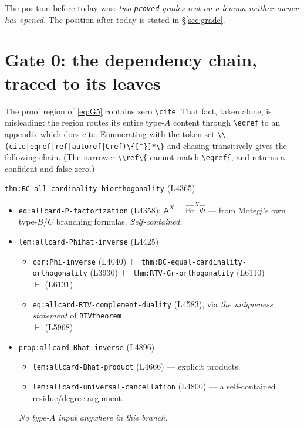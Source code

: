 \documentclass[11pt]{article}
\theoremstyle{plain}
\theoremstyle{definition}
\theoremstyle{remark}
\newcommand{\Bh}{\widehat{\mathrm{Br}}}
\begin{document}
The position before today was: \emph{two \texttt{proved} grades rest on a lemma
neither owner has opened.} The position after today is stated in
\S\ref{sec:grade}.

\section{Gate 0: the dependency chain, traced to its leaves}
\label{sec:gate}

The proof region of \eqref{eq:G5} contains zero \verb|\cite|. That fact, taken
alone, is misleading: the region routes its entire type-$A$ content through
\verb|\eqref| to an appendix which does cite. Enumerating with the token set
\verb+\\(cite|eqref|ref|autoref|Cref)\{[^}]*\}+ and chasing transitively gives the
following chain. (The narrower \verb+\\ref\{+ cannot match \verb+\eqref{+, and
returns a confident and false zero.)

\begin{center}
\begin{minipage}{0.95\textwidth}
\small
\texttt{thm:BC-all-cardinality-biorthogonality} (L4365)
\begin{itemize}[leftmargin=1.3em,itemsep=1pt]
\item[$\vdash$] \texttt{eq:allcard-P-factorization} (L4358):
      $\mathsf A^X=\Bh^X\widehat\Phi$ --- from Motegi's own type-$B$/$C$ branching
      formulas. \emph{Self-contained.}
\item[$\vdash$] \texttt{lem:allcard-Phihat-inverse} (L4425)
   \begin{itemize}[leftmargin=1.3em,itemsep=0pt]
   \item[$\vdash$] \texttt{cor:Phi-inverse} (L4040) $\vdash$
         \texttt{thm:BC-equal-cardinality-orthogonality} (L3930) $\vdash$
         \texttt{thm:RTV-Gr-orthogonality} (L6110)\\
         $\vdash$  (L6131)
   \item[$\vdash$] \texttt{eq:allcard-RTV-complement-duality} (L4583), via
         \emph{the uniqueness statement} of \texttt{RTVtheorem}\\
         $\vdash$  (L5968)
   \end{itemize}
\item[$\vdash$] \texttt{prop:allcard-Bhat-inverse} (L4896)
   \begin{itemize}[leftmargin=1.3em,itemsep=0pt]
   \item[$\vdash$] \texttt{lem:allcard-Bhat-product} (L4666) --- explicit products.
   \item[$\vdash$] \texttt{lem:allcard-universal-cancellation} (L4800) --- a
         self-contained residue/degree argument.
   \end{itemize}
   \emph{No type-$A$ input anywhere in this branch.}
\end{itemize}
\end{minipage}
\end{center}
\end{document}
